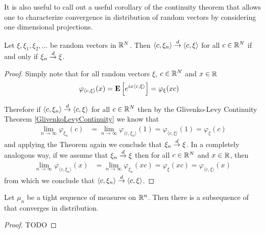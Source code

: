 It is also useful to call out a useful corollary of the continuity
theorem that allows one to characterize convergence in distribution of
random vectors by considering one dimensional projections.
\begin{cor}\label{CramerWoldDevice}Let $\xi, \xi_1, \xi_2, \dotsc$ be 
  random vectors in $\mathbb{R}^N$.  Then $\langle c, \xi_n \rangle
  \overset{d}\to \langle c, \xi \rangle$ for all $c \in \mathbb{R}^N$ if and only
  if $\xi_n \overset{d}\to \xi$.
\end{cor}
\begin{proof}
Simply note that for all random vectors $\xi$,
$c \in \mathbb{R}^N$ and $x \in \mathbb{R}$
\begin{align*}
\varphi_{\langle c , \xi\rangle}(x) &= \textbf{E}\left[e^{i x \langle
    c , \xi \rangle} \right]= \varphi_\xi(x c)
\end{align*}
 
Therefore if $\langle c, \xi_n \rangle
  \overset{d}\to \langle c, \xi \rangle$ for all $c \in \mathbb{R}^N$ then by the
  Glivenko-Levy Continuity Theorem \ref{GlivenkoLevyContinuity}
we know that 
\begin{align*}
\lim_{n \to \infty} \varphi_{\xi_n}(c) &= \lim_{n \to \infty}
\varphi_{\langle c, \xi_n \rangle}(1) = \varphi_{\langle c, \xi
  \rangle}(1) = \varphi_\xi(c)
\end{align*}
and applying the Theorem again we conclude that $\xi_n \overset{d}\to \xi$.  In
a completely analogous way, if we assume that $\xi_n \overset{d}\to \xi$ then
for all $c \in \mathbb{R}^N$ and $x\in \mathbb{R}$, then
\begin{align*}
\lim_{n \to \infty} \varphi_{\langle c, \xi_n \rangle}(x) &= \lim_{n \to \infty}
\varphi_{\xi_n}(x c) = \varphi_{\xi}(x c) = \varphi_{\langle c, \xi \rangle}(x)
\end{align*}
from which we conclude that $\langle c, \xi_n \rangle \overset{d}\to \langle
c, \xi \rangle$.
\end{proof}

\begin{thm}Let $\mu_n$ be a tight sequence of
  measures on $\mathbb{R}^n$.  Then there is a subsequence of that
  converges in distribution.
\end{thm}
\begin{proof}
TODO
\end{proof}
 
